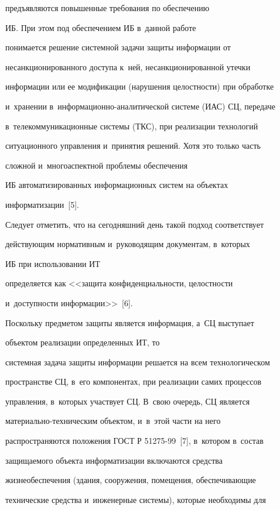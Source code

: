 предъявляются повышенные требования по обеспечению 

ИБ. При этом под обеспечением ИБ в~данной работе 

понимается решение сис\-тем\-ной задачи защиты информации от 

несанкционированного доступа к~ней, несанкционированной утечки 

информации или ее модификации (нарушения целостности) при обработке 

и~хранении в~ин\-фор\-ма\-ци\-он\-но-ана\-ли\-ти\-че\-ской системе (ИАС) СЦ, передаче 

в~телекоммуникационные системы (ТКС), при реализации технологий 

ситуационного управления и~принятия решений. Хотя это только часть 

сложной и~многоаспектной проблемы обеспечения 

ИБ автоматизированных информационных сис\-тем на объектах 

информатизации~[5].

    

    Следует отметить, что на сегодняшний день такой подход соответствует 

действующим нормативным и~руководящим документам, в~которых 

ИБ при использовании ИТ

определяется как <<защита конфиденциальности, целостности 

и~доступности информации>>~[6].

    

    Поскольку предметом защиты является информация, а~СЦ выступает 

объектом реализации определенных ИТ, то 

сис\-тем\-ная задача защиты информации решается на всем технологическом 

пространстве СЦ, в~его компонентах, при реализации самих процессов 

управления, в~которых участвует СЦ. В~свою очередь, СЦ является 

ма\-те\-ри\-аль\-но-тех\-ни\-че\-ским объектом, и~в~этой части на него 

распространяются положения ГОСТ Р 51275-99~[7], в~котором в~состав 

защищаемого объекта информатизации включаются средства 

жизнеобеспечения (здания, сооружения, помещения, обеспечивающие 

технические средства и~инженерные сис\-те\-мы), которые необходимы для 

